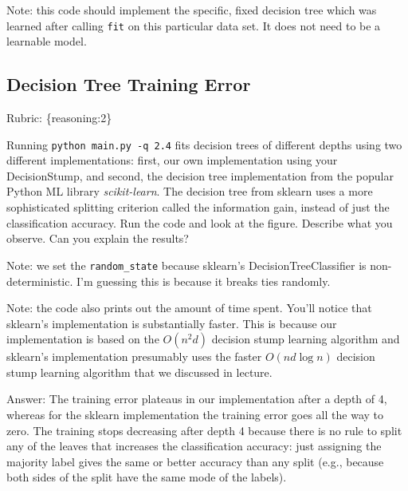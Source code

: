 \documentclass{article}
\def\ans#1{\par\gre{Answer: #1}}
\def\answer#1{\ans{#1}}
\def\rubric#1{\gre{Rubric: \{#1\}}}{}
\def\blu#1{{\color{blu}#1}}
\def\gre#1{{\color{gre}#1}}
\begin{document}
Note: this code should implement the specific, fixed decision tree
which was learned after calling \texttt{fit} on this particular data set. It does not need to be a learnable model.


\subsection{Decision Tree Training Error}
\rubric{reasoning:2}

Running \texttt{python main.py -q 2.4} fits decision trees of different depths using two different implementations: first,
our own implementation using your DecisionStump, and second, the decision tree implementation from the popular Python ML library \emph{scikit-learn}.
The decision tree from sklearn uses a more sophisticated splitting criterion called the information gain, instead of just the classification accuracy.
Run the code and look at the figure.
\blu{Describe what you observe. Can you explain the results?}

Note: we set the \verb|random_state| because sklearn's DecisionTreeClassifier is non-deterministic. I'm guessing this is
because it breaks ties randomly.

Note: the code also prints out the amount of time spent. You'll notice that sklearn's implementation is substantially faster. This is because
our implementation is based on the $O(n^2d)$ decision stump learning algorithm and sklearn's implementation presumably uses the faster $O(nd\log n)$
decision stump learning algorithm that we discussed in lecture.

\answer{
% 
The training error plateaus in our implementation after a depth of 4, whereas for the sklearn implementation the training error goes all the way to zero.
The training stops decreasing after depth 4 because there is no rule to split
any of the leaves that increases the classification accuracy:
just assigning the majority label gives the same or better accuracy than any split (e.g., because both sides of the split have the same mode of the labels).
}
\end{document}
